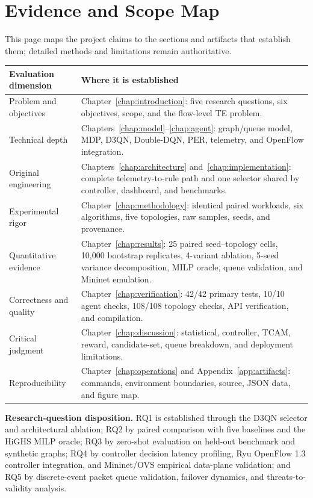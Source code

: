 \documentclass[12pt,a4paper,oneside]{report}
\begin{document}
\chapter*{Evidence and Scope Map}
This page maps the project claims to the sections and artifacts that establish them; detailed methods and limitations remain authoritative.

{\footnotesize
\renewcommand{\arraystretch}{0.92}
\noindent
\begin{tabularx}{\textwidth}{>{\raggedright\arraybackslash}p{32mm}>{\raggedright\arraybackslash}X}
\toprule
\textbf{Evaluation dimension} & \textbf{Where it is established}\\
\midrule
Problem and objectives & Chapter~\ref{chap:introduction}: five research questions, six objectives, scope, and the flow-level TE problem.\\
Technical depth & Chapters~\ref{chap:model}--\ref{chap:agent}: graph/queue model, MDP, D3QN, Double-DQN, PER, telemetry, and OpenFlow integration.\\
Original engineering & Chapters~\ref{chap:architecture} and~\ref{chap:implementation}: complete telemetry-to-rule path and one selector shared by controller, dashboard, and benchmarks.\\
Experimental rigor & Chapter~\ref{chap:methodology}: identical paired workloads, six algorithms, five topologies, raw samples, seeds, and provenance.\\
Quantitative evidence & Chapter~\ref{chap:results}: 25 paired seed--topology cells, 10,000 bootstrap replicates, 4-variant ablation, 5-seed variance decomposition, MILP oracle, queue validation, and Mininet emulation.\\
Correctness and quality & Chapter~\ref{chap:verification}: 42/42 primary tests, 10/10 agent checks, 108/108 topology checks, API verification, and compilation.\\
Critical judgment & Chapter~\ref{chap:discussion}: statistical, controller, TCAM, reward, candidate-set, queue breakdown, and deployment limitations.\\
Reproducibility & Chapter~\ref{chap:operations} and Appendix~\ref{app:artifacts}: commands, environment boundaries, source, JSON data, and figure map.\\
\bottomrule
\end{tabularx}
}

\vspace{2mm}
\noindent\textbf{Research-question disposition.} RQ1 is established through the D3QN selector and architectural ablation; RQ2 by paired comparison with five baselines and the HiGHS MILP oracle; RQ3 by zero-shot evaluation on held-out benchmark and synthetic graphs; RQ4 by controller decision latency profiling, Ryu OpenFlow 1.3 controller integration, and Mininet/OVS empirical data-plane validation; and RQ5 by discrete-event packet queue validation, failover dynamics, and threats-to-validity analysis.
\end{document}
